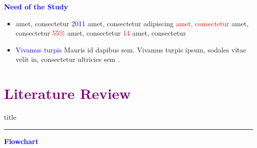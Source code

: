 \documentclass[aspectratio=169]{beamer}
\begin{document}
\begin{frame}{\textcolor{blue}{\textbf{Need of the Study}}}
    \vspace{-1cm}
\begin{itemize}
        \item amet, consectetur \textcolor{blue}{2011} amet, consectetur adipiscing \textcolor{red}{amet, consectetur} amet, consectetur \textcolor{red}{55\%} amet, consectetur \textcolor{red}{14} amet, consectetur \cite{Koh-2014}
        \item \textcolor{blue}{Vivamus turpis} Mauris id dapibus sem. Vivamus turpis ipsum, sodales vitae velit in, consectetur ultricies sem \cite{Hussain-2021}. 
        
    \end{itemize}

\end{frame}


\section{\textbf{\textcolor{purple}{Literature Review}}}
    \begin{frame}[plain]
        \vfill
      \centering
      \begin{beamercolorbox}[sep=8pt,center,shadow=true,rounded=true]{title}
        \insertsectionhead\par%
        \color{oxfordblue}\noindent\rule{10cm}{1pt}
      \end{beamercolorbox}
      \vfill
  \end{frame}


\begin{frame}{\textcolor{blue}{\textbf{Flowchart}}}
    \vspace{-0.8cm}

\end{frame}
\end{document}
